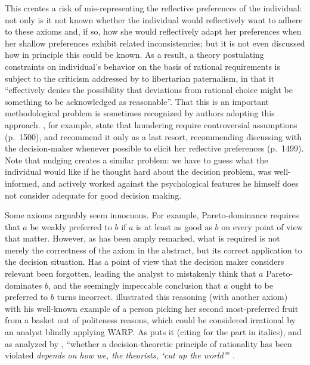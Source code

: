 \documentclass[version=last, pagesize, twoside=off, bibliography=totoc, DIV=calc, fontsize=12pt, a4paper, french, english]{scrartcl}
\begin{document}
This creates a risk of mis-representing the reflective preferences of the individual: not only is it not known whether the individual would reflectively want to adhere to these axioms and, if so, how she would reflectively adapt her preferences when her shallow preferences exhibit related inconsistencies; but it is not even discussed how in principle this could be known. As a result, a theory postulating constraints on individual’s behavior on the basis of rational requirements is subject to the criticism addressed by \citet[p.\ 228]{dold_toward_2018} to libertarian paternalism, in that it “effectively denies the possibility that deviations from rational choice might be something to be acknowledged as reasonable”. 
That this is an important methodological problem is sometimes recognized by authors adopting this approach. , for example, state that laundering require controversial assumptions (p.\ 1500), and recommend it only as a last resort, recommending discussing with the decision-maker whenever possible to elicit her reflective preferences (p.\ 1499). Note that nudging \citep{thaler_nudge_2009} creates a similar problem: we have to guess what the individual would like if he thought hard about the decision problem, was well-informed, and actively worked against the psychological features he himself does not consider adequate for good decision making. 

Some axioms arguably seem innocuous. For example, Pareto-dominance requires that $a$ be weakly preferred to $b$ if $a$ is at least as good as $b$ on every point of view that matter. However, as has been amply remarked, what is required is not merely the correctness of the axiom in the abstract, but its correct application to the decision situation. Has a point of view that the decision maker considers relevant been forgotten, leading the analyst to mistakenly think that $a$ Pareto-dominates $b$, and the seemingly impeccable conclusion that $a$ ought to be preferred to $b$ turns incorrect. \citet{sen_maximisation_1997} illustrated this reasoning (with another axiom) with his well-known example of a person picking her second most-preferred fruit from a basket out of politeness reasons, which could be considered irrational by an analyst blindly applying WARP. As \citet[p.\ 40]{lecouteux_reconciling_2015} puts it (citing \citet[p.\ 13]{bacharach_beyond_2006} for the part in italics), and as analyzed by \citet{sen_information_1986, sen_internal_1993}, “whether a decision-theoretic principle of rationality has been violated \emph{depends on how we, the theorists, ‘cut up the world’}” .
\end{document}
